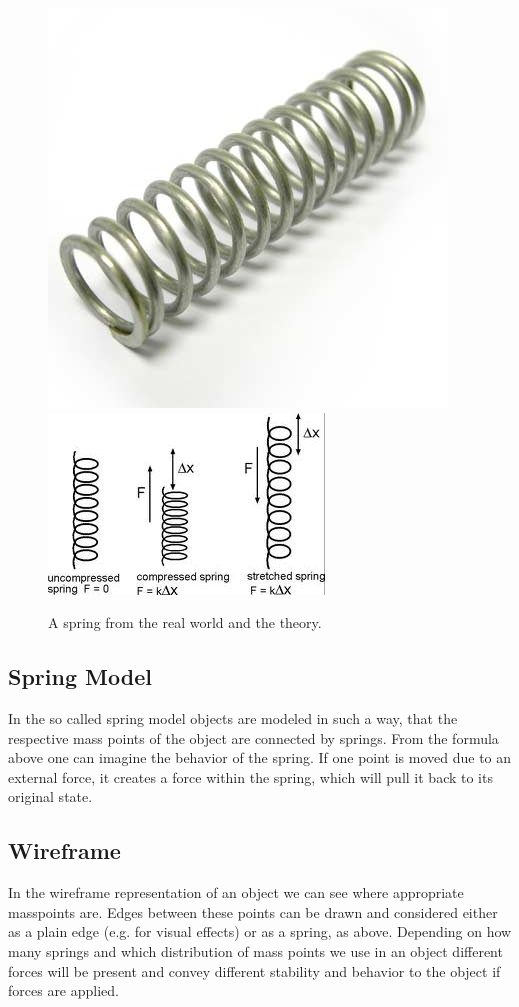 \documentclass[11pt]{article}
\begin{document}
\begin{figure}[h]
\centering
\includegraphics[scale=0.3]{realspring.jpg}
\includegraphics[scale=0.7]{spring.jpg}
\caption{A spring from the real world and the theory.}
\label{fig:spring-real}
\end{figure}

\subsection{Spring Model}
In the so called spring model objects are modeled in such a way, that the respective mass points of the object are connected by springs. From the formula above one can imagine the behavior of the spring. If one point is moved due to an external force, it creates a force within the spring, which will pull it back to its original state.

\subsection{Wireframe}
In the wireframe representation of an object we can see where appropriate masspoints are. Edges between these points can be drawn and considered either as a plain edge (e.g. for visual effects) or as a spring, as above. Depending on how many springs and which distribution of mass points we use in an object different forces will be present and convey different stability and behavior to the object if forces are applied.
%
%
%
\end{document}
